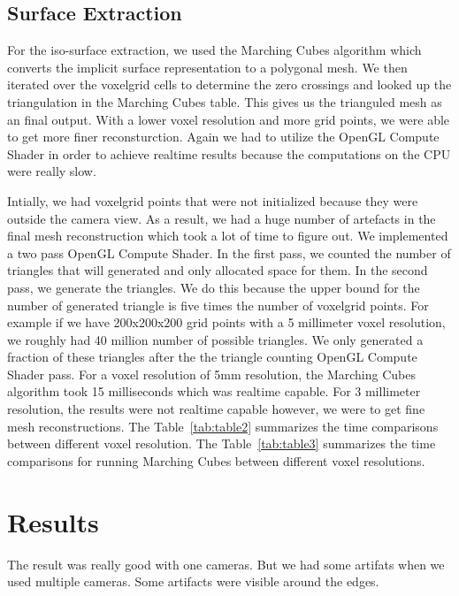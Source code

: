 \documentclass[10pt,twocolumn,letterpaper]{article}
\begin{document}
\subsection{Surface Extraction}
For the iso-surface extraction, we used the Marching Cubes algorithm which converts the implicit surface representation to a polygonal mesh. We then iterated over the voxelgrid cells to determine the zero crossings and looked up the triangulation in the Marching Cubes table. This gives us the trianguled mesh as an final output. With a lower voxel resolution and more grid points, we were able to get more finer reconsturction. Again we had to utilize the OpenGL Compute Shader in order to achieve realtime results because the computations on the CPU were really slow.

Intially, we had voxelgrid points that were not initialized because they were outside the camera view. As a result, we had a huge number of artefacts in the final mesh reconstruction which took a lot of time to figure out. We implemented a two pass OpenGL Compute Shader. In the first pass, we counted the number of triangles that will generated and only allocated space for them. In the second pass, we generate the triangles. We do this because the upper bound for the number of generated triangle is five times the number of voxelgrid points. For example if we have 200x200x200 grid points with a 5 millimeter voxel resolution, we roughly had 40 million number of possible triangles. We only generated a fraction of these triangles after the the triangle counting OpenGL Compute Shader pass. For a voxel resolution of 5mm resolution, the Marching Cubes algorithm took 15 milliseconds which was realtime capable. For 3 millimeter resolution, the results were not realtime capable however, we were to get fine mesh reconstructions.  The Table~\ref{tab:table2} summarizes the time comparisons between different voxel resolution. The Table~\ref{tab:table3} summarizes the time comparisons for running Marching Cubes between different voxel resolutions. 

\section{Results}
The result was really good with one cameras. But we had some artifats when we used multiple cameras. Some artifacts were visible around the edges.
\end{document}

